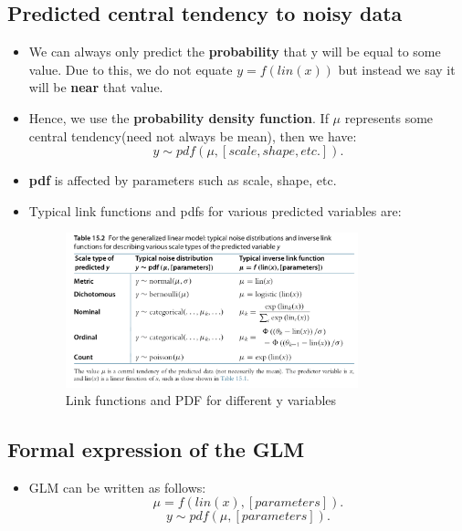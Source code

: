 \documentclass[a4paper]{article}
\begin{document}
\subsection{Predicted central tendency to noisy data}
\begin{itemize}
    \item We can always only predict the \textbf{probability} that y will be equal to some value. Due to this, we do not equate $y = f(lin(x))$ but instead we say it will be  \textbf{near} that value.  
    \item Hence, we use the \textbf{probability density function}. If $\mu$ represents some central tendency(need not always be mean), then we have:
    \[
        y \sim pdf(\mu, [scale, shape, etc.])
    .\] 
    \item \textbf{pdf} is affected by parameters such as scale, shape, etc. 
    \item Typical link functions and pdfs for various predicted variables are:
    \begin{figure}[H]
        \centering
        \includegraphics[width=0.8\textwidth]{typical_link_pdf}
        \caption{Link functions and PDF for different y variables}
        \label{fig:typical_link_pdf}
    \end{figure}
\end{itemize}
\subsection{Formal expression of the GLM}
\begin{itemize}
    \item GLM can be written as follows:
    \[
        \mu = f(lin(x), [parameters])
    .\] 
    \[
        y \sim pdf(\mu, [parameters])
    .\] 
\end{itemize}
\end{document}
